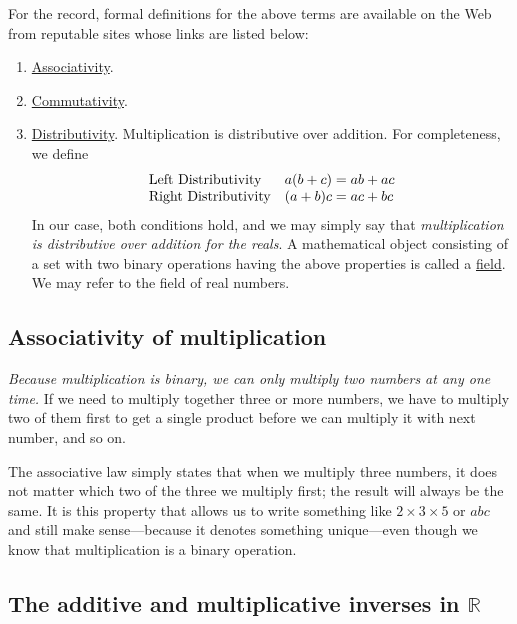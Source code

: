 \documentclass[
  a4paper,
]{article}
\begin{document}
For the record, formal definitions for the above terms are available on
the Web from reputable sites whose links are listed below:

\begin{enumerate}
\item
  \href{https://mathworld.wolfram.com/Associative.html}{Associativity}.
\item
  \href{https://mathworld.wolfram.com/Commutative.html}{Commutativity}.
\item
  \href{https://en.wikipedia.org/wiki/Distributive_property}{Distributivity}.
  Multiplication is distributive over addition. For completeness, we
  define \[
  \begin{array}{l  l}
  \mbox{Left Distributivity} & a(b+c)=ab+ac\\
  \mbox{Right Distributivity} & (a+b)c=ac+bc\\
  \end{array}
  \] In our case, both conditions hold, and we may simply say that
  \emph{multiplication is distributive over addition for the reals}. A
  mathematical object consisting of a set with two binary operations
  having the above properties is called a
  \href{https://en.wikipedia.org/wiki/Field_(mathematics)}{field}. We
  may refer to the field of real numbers.
\end{enumerate}

\hypertarget{associativity-of-multiplication}{%
\subsection{Associativity of
multiplication}\label{associativity-of-multiplication}}

\emph{Because multiplication is binary, we can only multiply two numbers
at any one time.} If we need to multiply together three or more numbers,
we have to multiply two of them first to get a single product before we
can multiply it with next number, and so on.

The associative law simply states that when we multiply three numbers,
it does not matter which two of the three we multiply first; the result
will always be the same. It is this property that allows us to write
something like \(2 \times 3 \times 5\) or \(abc\) and still make
sense---because it denotes something unique---even though we know that
multiplication is a binary operation.

\hypertarget{the-additive-and-multiplicative-inverses-in-mathbbr}{%
\subsection{\texorpdfstring{The additive and multiplicative inverses in
\(\mathbb{R}\)}{The additive and multiplicative inverses in \textbackslash mathbb\{R\}}}\label{the-additive-and-multiplicative-inverses-in-mathbbr}}
\end{document}
